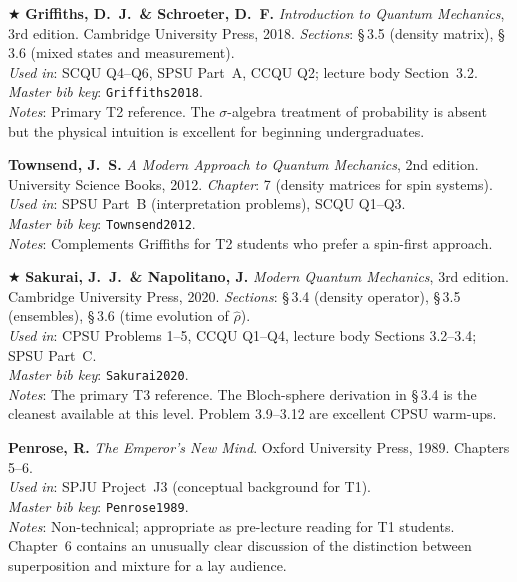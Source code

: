 \documentclass[11pt,a4paper]{article}
\begin{document}
\begin{enumerate}[leftmargin=2em, label={\textbf{[\arabic*]}}, itemsep=10pt]

\item $\bigstar$
  \textbf{Griffiths, D.~J.\ \& Schroeter, D.~F.}
  \textit{Introduction to Quantum Mechanics}, 3rd edition.
  Cambridge University Press, 2018.
  \textit{Sections}: \S\,3.5 (density matrix), \S\,3.6 (mixed states and measurement).\\
  \textit{Used in}: SCQU Q4--Q6, SPSU Part~A, CCQU Q2; lecture body Section~3.2.\\
  \textit{Master bib key}: \texttt{Griffiths2018}.\\
  \textit{Notes}: Primary T2 reference. The $\sigma$-algebra treatment of probability
  is absent but the physical intuition is excellent for beginning undergraduates.

\item
  \textbf{Townsend, J.~S.}
  \textit{A Modern Approach to Quantum Mechanics}, 2nd edition.
  University Science Books, 2012.
  \textit{Chapter}: 7 (density matrices for spin systems).\\
  \textit{Used in}: SPSU Part~B (interpretation problems), SCQU Q1--Q3.\\
  \textit{Master bib key}: \texttt{Townsend2012}.\\
  \textit{Notes}: Complements Griffiths for T2 students who prefer a spin-first approach.

\item $\bigstar$
  \textbf{Sakurai, J.~J.\ \& Napolitano, J.}
  \textit{Modern Quantum Mechanics}, 3rd edition.
  Cambridge University Press, 2020.
  \textit{Sections}: \S\,3.4 (density operator), \S\,3.5 (ensembles), \S\,3.6 (time evolution of $\hat{\rho}$).\\
  \textit{Used in}: CPSU Problems 1--5, CCQU Q1--Q4, lecture body Sections 3.2--3.4; SPSU Part~C.\\
  \textit{Master bib key}: \texttt{Sakurai2020}.\\
  \textit{Notes}: The primary T3 reference. The Bloch-sphere derivation in \S\,3.4 is
  the cleanest available at this level. Problem 3.9--3.12 are excellent CPSU warm-ups.

\item
  \textbf{Penrose, R.}
  \textit{The Emperor's New Mind}.
  Oxford University Press, 1989. Chapters 5--6.\\
  \textit{Used in}: SPJU Project~J3 (conceptual background for T1).\\
  \textit{Master bib key}: \texttt{Penrose1989}.\\
  \textit{Notes}: Non-technical; appropriate as pre-lecture reading for T1 students.
  Chapter~6 contains an unusually clear discussion of the distinction between
  superposition and mixture for a lay audience.


\end{enumerate}
\end{document}
